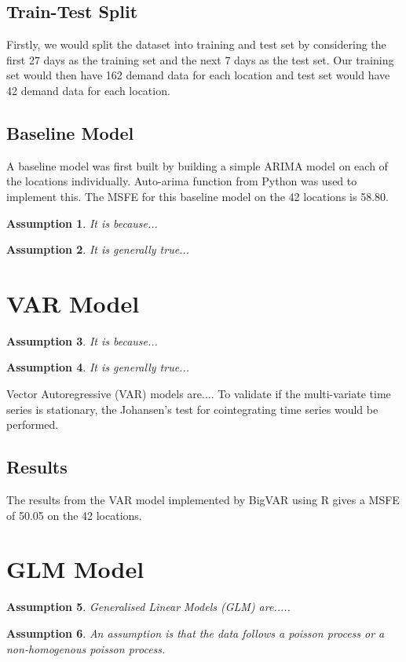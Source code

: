 \documentclass[10pt, letterpaper] {article}
\newtheorem{assumption}{Assumption}
\begin{document}
\subsection{Train-Test Split}
Firstly, we would split the dataset into training and test set by considering the first 27 days as the training set and the next 7 days as the test set. Our training set would then have 162 demand data for each location and test set would have 42 demand data for each location. 

\subsection{Baseline Model}
A baseline model was first built by building a simple ARIMA model on each of the locations individually. Auto-arima function from Python was used to implement this. The MSFE for this baseline model on the 42 locations is 58.80. 
\begin{assumption}
It is because...
\end{assumption}
\begin{assumption}
It is generally true...
\end{assumption}

\section{VAR Model}
\begin{assumption}
It is because...
\end{assumption}
\begin{assumption}
It is generally true...
\end{assumption}
Vector Autoregressive (VAR) models are....
To validate if the multi-variate time series is stationary, the Johansen's test for cointegrating time series would be performed. 
\subsection{Results}
The results from the VAR model implemented by BigVAR using R gives a MSFE of 50.05 on the 42 locations. 
\section{GLM Model}
\begin{assumption}
Generalised Linear Models (GLM) are.....
\end{assumption}
\begin{assumption}
An assumption is that the data follows a poisson process or a non-homogenous poisson process. 
\end{assumption}
\end{document}
